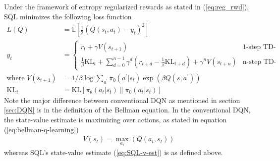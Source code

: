\documentclass[12pt]{report}
\begin{document}
Under the framework of entropy regularized rewards as stated in (\ref{eq:reg_rwd}), SQL minimizes the following loss function \cite{schulman2017equivalence}
\begin{align} \label{SQL-eqs}
    L(Q) &= \mathbb{E}\left[\frac{1}{2}\left(Q(s_t,a_t)-y_t\right)^2\right]\\
    y_t &= \begin{cases} r_t + \gamma V(s_{t+1})&\mbox{1-step TD-learning} \\
    \frac{1}{\beta}\text{KL}_t + \sum_{d=0}^{n-1}\gamma^d (r_{t+d}-\frac{1}{\beta}\text{KL}_{t+d}) + \gamma^n V(s_{t+n})& \mbox{n-step TD-learning} \end{cases}\\
    \text{where } V(s_{t+1}) &= 1/\beta \log \sum_{a^\prime} \pi_0(a^\prime|s_t) \exp{(\beta Q(s,a^\prime))} \label{eq:SQL-v-est}\\
    \text{KL}_t &= \text{KL}[\pi_\theta(a_t | s_t)\|\pi_0(a_t | s_t)]\nonumber
\end{align}
Note the major difference between conventional DQN as mentioned in section \ref{sec:DQN} is in the definition of the Bellman equation. In the conventional DQN, the state-value estimate is maximizing over actions, as stated in equation (\ref{eq:bellman-q-learning})
\begin{align}
    V(s_t) = \max_{a_t}(Q(a_t,s_t)) \nonumber
\end{align}
whereas SQL's state-value estimate (\ref{eq:SQL-v-est}) is as defined above. 
\end{document}
